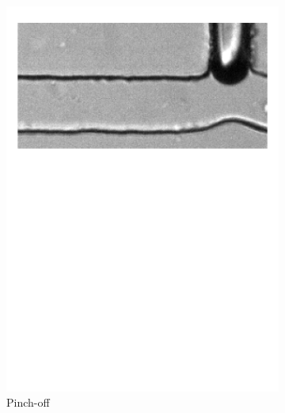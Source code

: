 \begin{figure}[h!]
\begin{subfigure}{0.24\linewidth}
		\includegraphics[page=12,clip,trim={10mm 190mm 00mm 20mm},width=\linewidth]{Ressourcen/PinchOff/Squeezing}
		\caption{Pinch-off}
		\label{fig:fluidics:droplet:squeezing:pinchoff}
	\end{subfigure}
	\hfil
	\begin{subfigure}{0.24\linewidth}
		\centering

\end{subfigure}
\end{figure}

